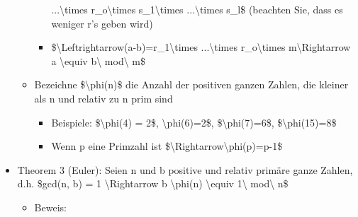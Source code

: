 \documentclass[a4paper]{article}
\begin{document}
\begin{multicols}{3}
\begin{itemize}
\begin{itemize}
\begin{itemize}
                                  ...\textbackslash times r\_o\textbackslash times
                                  s\_1\textbackslash times ...\textbackslash times s\_l\$ (beachten
                                  Sie, dass es weniger r's geben wird)
                            \item
                                  \$\textbackslash Leftrightarrow(a-b)=r\_1\textbackslash times
                                  ...\textbackslash times r\_o\textbackslash times
                                  m\textbackslash Rightarrow a \textbackslash equiv
                                  b\textbackslash{} mod\textbackslash{} m\$
                        \end{itemize}
                  \item
                        Bezeichne \$\textbackslash phi(n)\$ die Anzahl der positiven ganzen
                        Zahlen, die kleiner als n und relativ zu n prim sind

                        \begin{itemize}
                            \item
                                  Beispiele: \$\textbackslash phi(4) = 2\$,
                                  \textbackslash phi(6)=2\$, \$\textbackslash phi(7)=6\$,
                                  \$\textbackslash phi(15)=8\$
                            \item
                                  Wenn p eine Primzahl ist
                                  \$\textbackslash Rightarrow\textbackslash phi(p)=p-1\$
                        \end{itemize}
              \end{itemize}
        \item
              Theorem 3 (Euler): Seien n und b positive und relativ primäre ganze
              Zahlen, d.h. \$gcd(n, b) = 1 \textbackslash Rightarrow b
              \textbackslash phi(n) \textbackslash equiv 1\textbackslash{}
              mod\textbackslash{} n\$

              \begin{itemize}
                  \item
                        Beweis:


\end{itemize}
\end{itemize}
\end{multicols}
\end{document}
